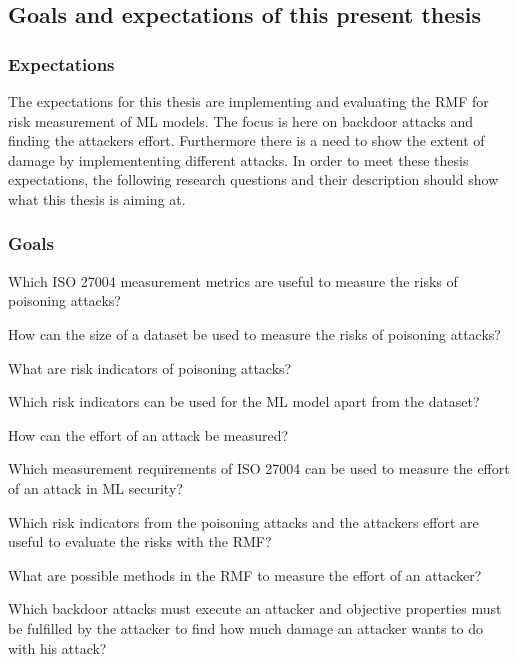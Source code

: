 \subsection{Goals and expectations of this present thesis}


\subsubsection*{Expectations}

The expectations for this thesis are implementing and evaluating the RMF for risk measurement of ML models. The focus is here on backdoor attacks and finding the attackers effort.
Furthermore there is a need to show the extent of damage by implemententing different attacks. In order to meet these thesis expectations, the following research questions and their
description should show what this thesis is aiming at.

\subsubsection*{Goals}

\begin{questions}
  \item Which ISO 27004 measurement metrics are useful to measure the risks of poisoning attacks? \label{itm:rq1}
  \item How can the size of a dataset be used to measure the risks of poisoning attacks? \label{itm:rq2}
  \item What are risk indicators of poisoning attacks? \label{itm:rq3}
  \item Which risk indicators can be used for the ML model apart from the dataset? \label{itm:rq4}
  \item How can the effort of an attack be measured? \label{itm:rq5}
  \item Which measurement requirements of ISO 27004 can be used to measure the effort of an attack in ML security? \label{itm:rq6}
  \item Which risk indicators from the poisoning attacks and the attackers effort are useful to evaluate the risks with the RMF? \label{itm:rq7}
  \item What are possible methods in the RMF to measure the effort of an attacker? \label{itm:rq8}
  \item Which backdoor attacks must execute an attacker and objective properties must be fulfilled by the attacker to find how much damage an attacker wants to do with his attack?
  \label{itm:rq9}
\end{questions}

